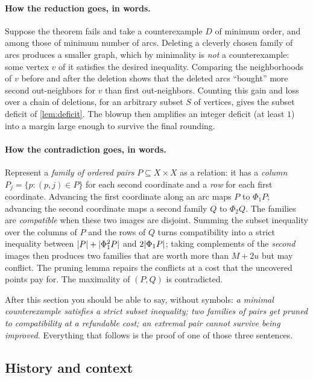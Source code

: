 \paragraph{How the reduction goes, in words.}
Suppose the theorem fails and take a counterexample $D$ of minimum order, and among those of
minimum number of arcs. Deleting a cleverly chosen family of arcs produces a smaller graph, which
by minimality is \emph{not} a counterexample: some vertex $v$ of it satisfies the desired
inequality. Comparing the neighborhoods of $v$ before and after the deletion shows that the
deleted arcs ``bought'' more second out-neighbors for $v$ than first out-neighbors. Counting this
gain and loss over a chain of deletions, for an arbitrary subset $S$ of vertices, gives the subset
deficit of \cref{lem:deficit}. The blowup then amplifies an integer deficit (at least $1$) into a
margin large enough to survive the final rounding.

\paragraph{How the contradiction goes, in words.}
Represent a \emph{family of ordered pairs} $P\subseteq X\times X$ as a relation: it has a
\emph{column} $P_j=\{p:(p,j)\in P\}$ for each second coordinate and a \emph{row} for each first
coordinate. Advancing the first coordinate along an arc maps $P$ to $\Phi_1P$; advancing the second
coordinate maps a second family $Q$ to $\Phi_2Q$. The families are \emph{compatible} when these two
images are disjoint. Summing the subset inequality over the columns of $P$ and the rows of $Q$ turns
compatibility into a strict inequality between $\lvert P\rvert+\lvert \Phi_1^2P\rvert$ and $2\lvert \Phi_1P\rvert$; taking
complements of the \emph{second} images then produces two families that are worth more than
$M+2u$ but may conflict. The pruning lemma repairs the conflicts at a cost that the uncovered
points pay for. The maximality of $(P,Q)$ is contradicted.

\begin{checkpoint}
After this section you should be able to say, without symbols: \emph{a minimal counterexample
satisfies a strict subset inequality; two families of pairs get pruned to compatibility at a
refundable cost; an extremal pair cannot survive being improved.} Everything that follows is the
proof of one of those three sentences.
\end{checkpoint}

\subsection{History and context}\label{sec:history}

